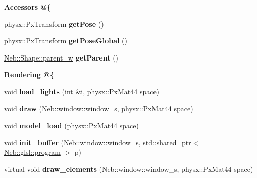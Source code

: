\begin{Indent}{\bf \-Accessors @\{}\par
\begin{DoxyCompactItemize}
\item 
\hypertarget{classNeb_1_1Shape_1_1shape_a6b1ff7eda9f9eabe12cf5ae183ee777b}{physx\-::\-Px\-Transform {\bfseries get\-Pose} ()}\label{classNeb_1_1Shape_1_1shape_a6b1ff7eda9f9eabe12cf5ae183ee777b}

\item 
\hypertarget{classNeb_1_1Shape_1_1shape_ad2ea5bcbb4c82d19e5ca13ac5c40fb19}{physx\-::\-Px\-Transform {\bfseries get\-Pose\-Global} ()}\label{classNeb_1_1Shape_1_1shape_ad2ea5bcbb4c82d19e5ca13ac5c40fb19}

\item 
\hypertarget{classNeb_1_1Shape_1_1shape_a08849b8b742ef42de207091ff9598521}{\hyperlink{classNeb_1_1weak__ptr}{\-Neb\-::\-Shape\-::parent\-\_\-w} {\bfseries get\-Parent} ()}\label{classNeb_1_1Shape_1_1shape_a08849b8b742ef42de207091ff9598521}

\end{DoxyCompactItemize}
\end{Indent}
\begin{Indent}{\bf \-Rendering @\{}\par
\begin{DoxyCompactItemize}
\item 
\hypertarget{classNeb_1_1Shape_1_1shape_ad1ab9b88edbd6fd0e03591ff75036abb}{void {\bfseries load\-\_\-lights} (int \&i, physx\-::\-Px\-Mat44 space)}\label{classNeb_1_1Shape_1_1shape_ad1ab9b88edbd6fd0e03591ff75036abb}

\item 
\hypertarget{classNeb_1_1Shape_1_1shape_ab5ac6ec5c373da456f7c3d72b51c691f}{void {\bfseries draw} (\-Neb\-::window\-::window\-\_\-s, physx\-::\-Px\-Mat44 space)}\label{classNeb_1_1Shape_1_1shape_ab5ac6ec5c373da456f7c3d72b51c691f}

\item 
\hypertarget{classNeb_1_1Shape_1_1shape_a5fa42d964935d426ba7b0f1aa95cfc6a}{void {\bfseries model\-\_\-load} (physx\-::\-Px\-Mat44 space)}\label{classNeb_1_1Shape_1_1shape_a5fa42d964935d426ba7b0f1aa95cfc6a}

\item 
\hypertarget{classNeb_1_1Shape_1_1shape_a8df9182a4079c3a05e8df6f9f4b32676}{void {\bfseries init\-\_\-buffer} (\-Neb\-::window\-::window\-\_\-s, std\-::shared\-\_\-ptr$<$ \hyperlink{classNeb_1_1glsl_1_1program}{\-Neb\-::glsl\-::program} $>$ p)}\label{classNeb_1_1Shape_1_1shape_a8df9182a4079c3a05e8df6f9f4b32676}

\item 
\hypertarget{classNeb_1_1Shape_1_1shape_aaf7bb44f2cc26a0e151ed9993a240c07}{virtual void {\bfseries draw\-\_\-elements} (\-Neb\-::window\-::window\-\_\-s, physx\-::\-Px\-Mat44 space)}\label{classNeb_1_1Shape_1_1shape_aaf7bb44f2cc26a0e151ed9993a240c07}

\end{DoxyCompactItemize}
\end{Indent}
